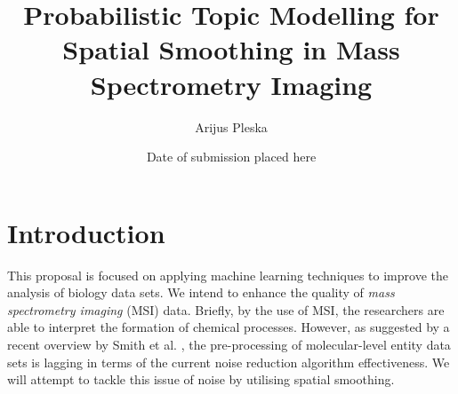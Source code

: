 \documentclass{mprop}
\begin{document}
\title{Probabilistic Topic Modelling for Spatial Smoothing in Mass Spectrometry Imaging}
\author{Arijus Pleska}
\date{Date of submission placed here}
\maketitle

\tableofcontents
\newpage


\section{Introduction}






\par This proposal is focused on applying machine learning techniques to improve the analysis of biology data sets. We intend to enhance the quality of \textit{mass spectrometry imaging} (MSI) data. Briefly, by the use of MSI, the researchers are able to interpret the formation of chemical processes. However, as suggested by a recent overview by Smith et al. \cite{smith_2004}, the pre-processing of molecular-level entity data sets is lagging in terms of the current noise reduction algorithm effectiveness. We will attempt to tackle this issue of noise by utilising spatial smoothing. 
  

\end{document}
